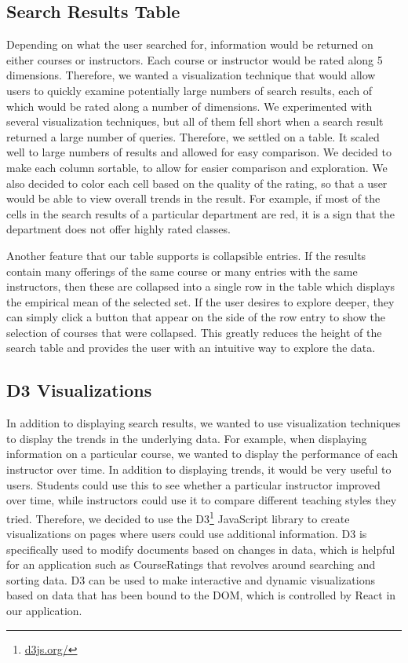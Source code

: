 \documentclass{chi2009}
\begin{document}
\subsection{Search Results Table}
Depending on what the user searched for, information would be returned on either courses or instructors. Each course or instructor would be rated along 5 dimensions. Therefore, we wanted a visualization technique that would allow users to quickly examine potentially large numbers of search results, each of which would be rated along a number of dimensions. We experimented with several visualization techniques, but all of them fell short when a search result returned a large number of queries. Therefore, we settled on a table. It scaled well to large numbers of results and allowed for easy comparison. We decided to make each column sortable, to allow for easier comparison and exploration. We also decided to color each cell based on the quality of the rating, so that a user would be able to view overall trends in the result. For example, if most of the cells in the search results of a particular department are red, it is a sign that the department does not offer highly rated classes.

Another feature that our table supports is collapsible entries. If the results contain many offerings of the same course or many entries with the same instructors, then these are collapsed into a single row in the table which displays the empirical mean of the selected set. If the user desires to explore deeper, they can simply click a button that appear on the side of the row entry to show the selection of courses that were collapsed. This greatly reduces the height of the search table and provides the user with an intuitive way to explore the data.

\subsection{D3 Visualizations}
In addition to displaying search results, we wanted to use visualization techniques to display the trends in the underlying data. For example, when displaying information on a particular course, we wanted to display the performance of each instructor over time. In addition to displaying trends, it would be very useful to users. Students could use this to see whether a particular instructor improved over time, while instructors could use it to compare different teaching styles they tried. Therefore, we decided to use the D3\footnote{\href{d3js.org/}{d3js.org/}} JavaScript library to create visualizations on pages where users could use additional information. D3 is specifically used to modify documents based on changes in data, which is helpful for an application such as CourseRatings that revolves around searching and sorting data.  D3 can be used to make interactive and dynamic visualizations based on data that has been bound to the DOM, which is controlled by React in our application.
\end{document}
